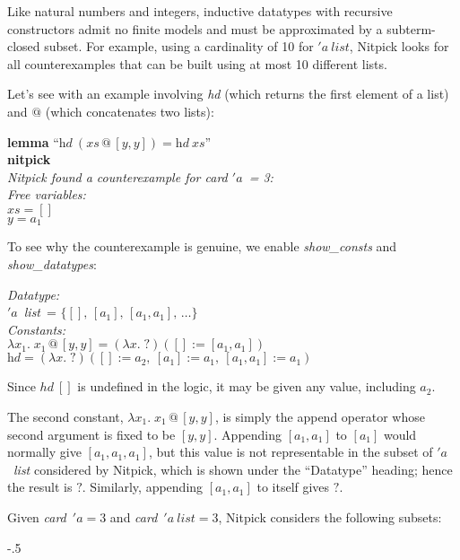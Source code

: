 \documentclass[a4paper,12pt]{article}
\def\unk{{?}}
\def\undef{(\lambda x.\; \unk)}
\def\unr{\ldots}
\begin{document}
Like natural numbers and integers, inductive datatypes with recursive
constructors admit no finite models and must be approximated by a subterm-closed
subset. For example, using a cardinality of 10 for ${'}a~\textit{list}$,
Nitpick looks for all counterexamples that can be built using at most 10
different lists.

Let's see with an example involving \textit{hd} (which returns the first element
of a list) and $@$ (which concatenates two lists):

\prew
\textbf{lemma} ``$\textit{hd}~(\textit{xs} \mathbin{@} [y, y]) = \textit{hd}~\textit{xs}$'' \\
\textbf{nitpick} \\[2\smallskipamount]
\slshape Nitpick found a counterexample for \textit{card} $'a$~= 3: \\[2\smallskipamount]
\hbox{}\qquad Free variables: \nopagebreak \\
\hbox{}\qquad\qquad $\textit{xs} = []$ \\
\hbox{}\qquad\qquad $\textit{y} = a_1$
\postw

To see why the counterexample is genuine, we enable \textit{show\_consts}
and \textit{show\_\allowbreak datatypes}:

\prew
{\slshape Datatype:} \\
\hbox{}\qquad $'a$~\textit{list}~= $\{[],\, [a_1],\, [a_1, a_1],\, \unr\}$ \\
{\slshape Constants:} \\
\hbox{}\qquad $\lambda x_1.\; x_1 \mathbin{@} [y, y] = \undef([] := [a_1, a_1])$ \\
\hbox{}\qquad $\textit{hd} = \undef([] := a_2,\> [a_1] := a_1,\> [a_1, a_1] := a_1)$
\postw

Since $\mathit{hd}~[]$ is undefined in the logic, it may be given any value,
including $a_2$.

The second constant, $\lambda x_1.\; x_1 \mathbin{@} [y, y]$, is simply the
append operator whose second argument is fixed to be $[y, y]$. Appending $[a_1,
a_1]$ to $[a_1]$ would normally give $[a_1, a_1, a_1]$, but this value is not
representable in the subset of $'a$~\textit{list} considered by Nitpick, which
is shown under the ``Datatype'' heading; hence the result is $\unk$. Similarly,
appending $[a_1, a_1]$ to itself gives $\unk$.

Given \textit{card}~$'a = 3$ and \textit{card}~$'a~\textit{list} = 3$, Nitpick
considers the following subsets:

\kern-.5\smallskipamount %
\end{document}
